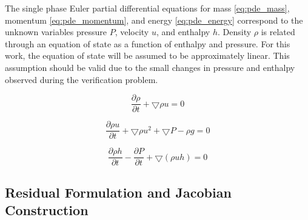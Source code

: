 \documentclass{mc2015}
\begin{document}
The single phase Euler partial differential equations for mass
\eqref{eq:pde_mass}, momentum \eqref{eq:pde_momentum}, and energy
\eqref{eq:pde_energy} correspond to the unknown variables pressure $P$,
velocity $u$, and enthalpy $h$. Density $\rho$ is related through an equation
of state \cite{Cooper2007} as a function of enthalpy and pressure. For this
work, the equation of state will be assumed to be approximately linear. This
assumption should be valid due to the small changes in pressure and enthalpy
observed during the verification problem.
    
    \begin{equation}
    	\label{eq:pde_mass}
    	\frac{ \partial \rho}{\partial t} + \bigtriangledown \rho u = 0
    \end{equation}
    
    \begin{equation}
    	\label{eq:pde_momentum}
    	\frac{ \partial \rho u}{\partial t} + \bigtriangledown \rho u^{2} +
    	\bigtriangledown P - \rho g  = 0
    \end{equation}
    
    \begin{equation}
    	\label{eq:pde_energy}
    	\frac{ \partial \rho h}{\partial t} -
    	\frac{ \partial  P}{\partial t} + 
    	\bigtriangledown ( \rho  u h )
    	= 0
    \end{equation}

\subsection{Residual Formulation and Jacobian Construction}
\end{document}
